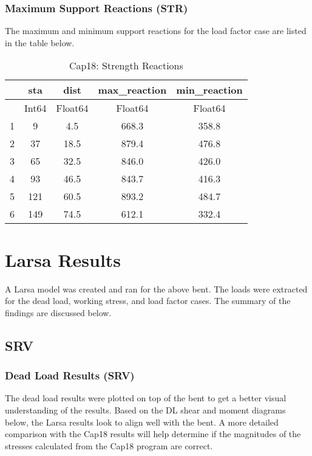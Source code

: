 \documentclass[
  letterpaper,
  DIV=11,
  numbers=noendperiod]{scrartcl}
\begin{document}
\subsubsection{Maximum Support Reactions
(STR)}\label{maximum-support-reactions-str}

The maximum and minimum support reactions for the load factor case are
listed in the table below.

\begin{table}
\caption{Cap18: Strength Reactions}\tabularnewline

\centering
\begin{tabular}{r|cccc}
    & sta & dist & max\_reaction & min\_reaction\\
    \hline
    & Int64 & Float64 & Float64 & Float64\\
    \hline
    1 & 9 & 4.5 & 668.3 & 358.8 \\
    2 & 37 & 18.5 & 879.4 & 476.8 \\
    3 & 65 & 32.5 & 846.0 & 426.0 \\
    4 & 93 & 46.5 & 843.7 & 416.3 \\
    5 & 121 & 60.5 & 893.2 & 484.7 \\
    6 & 149 & 74.5 & 612.1 & 332.4 \\
\end{tabular}
\end{table}

\newpage{}

\section{Larsa Results}\label{larsa-results}

A Larsa model was created and ran for the above bent. The loads were
extracted for the dead load, working stress, and load factor cases. The
summary of the findings are discussed below.

\subsection{SRV}\label{srv-1}

\subsubsection{Dead Load Results (SRV)}\label{dead-load-results-srv-1}

The dead load results were plotted on top of the bent to get a better
visual understanding of the results. Based on the DL shear and moment
diagrams below, the Larsa results look to align well with the bent. A
more detailed comparison with the Cap18 results will help determine if
the magnitudes of the stresses calculated from the Cap18 program are
correct.
\end{document}
